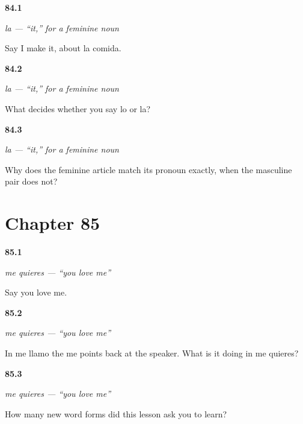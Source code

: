 \noindent\begin{minipage}[t]{\linewidth}
\raggedright
\hypertarget{review-ES-C42-la-form}{\textbf{84.1}} \emph{la — \textquotedblleft{}it,\textquotedblright{} for a feminine noun}\par
\small Say I make it, about la comida.
\end{minipage}\par\medskip

\noindent\begin{minipage}[t]{\linewidth}
\raggedright
\hypertarget{review-ES-C42-la-agree}{\textbf{84.2}} \emph{la — \textquotedblleft{}it,\textquotedblright{} for a feminine noun}\par
\small What decides whether you say lo or la?
\end{minipage}\par\medskip

\noindent\begin{minipage}[t]{\linewidth}
\raggedright
\hypertarget{review-ES-C42-la-why}{\textbf{84.3}} \emph{la — \textquotedblleft{}it,\textquotedblright{} for a feminine noun}\par
\small Why does the feminine article match its pronoun exactly, when the masculine pair does not?
\end{minipage}\par\medskip

\section*{Chapter 85}

\noindent\begin{minipage}[t]{\linewidth}
\raggedright
\hypertarget{review-ES-C42-me-objeto-say}{\textbf{85.1}} \emph{me quieres — \textquotedblleft{}you love me\textquotedblright{}}\par
\small Say you love me.
\end{minipage}\par\medskip

\noindent\begin{minipage}[t]{\linewidth}
\raggedright
\hypertarget{review-ES-C42-me-objeto-difference}{\textbf{85.2}} \emph{me quieres — \textquotedblleft{}you love me\textquotedblright{}}\par
\small In me llamo the me points back at the speaker. What is it doing in me quieres?
\end{minipage}\par\medskip

\noindent\begin{minipage}[t]{\linewidth}
\raggedright
\hypertarget{review-ES-C42-me-objeto-new}{\textbf{85.3}} \emph{me quieres — \textquotedblleft{}you love me\textquotedblright{}}\par
\small How many new word forms did this lesson ask you to learn?
\end{minipage}\par\medskip

